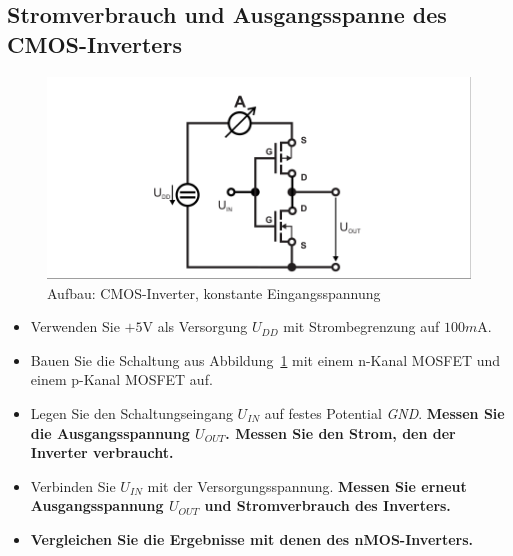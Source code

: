 \documentclass[10pt]{scrreprt}
\begin{document}
    \subsection{Stromverbrauch und Ausgangsspanne des CMOS-Inverters}
    \begin{figure}[H]
        \includegraphics[width=\textwidth]{abb16.png}
        \caption{Aufbau: CMOS-Inverter, konstante Eingangsspannung}
        \label{fig:abb16}
    \end{figure}
    \begin{itemize}
        \item Verwenden Sie $+5\si{\volt}$ als Versorgung $U_{DD}$ mit Strombegrenzung auf $100\si{m\ampere}$.
        \item Bauen Sie die Schaltung aus Abbildung~\ref{fig:abb16} mit einem n-Kanal MOSFET und einem
            p-Kanal MOSFET auf.
        \item Legen Sie den Schaltungseingang $U_{IN}$ auf festes Potential \textit{GND}. \textbf{Messen Sie die
            Ausgangsspannung $U_{OUT}$. Messen Sie den Strom, den der Inverter verbraucht.}
        \item Verbinden Sie $U_{IN}$ mit der Versorgungsspannung. \textbf{Messen Sie erneut
            Ausgangsspannung $U_{OUT}$ und Stromverbrauch des Inverters.}
        \item \textbf{Vergleichen Sie die Ergebnisse mit denen des nMOS-Inverters.}
    \end{itemize}
\end{document}
